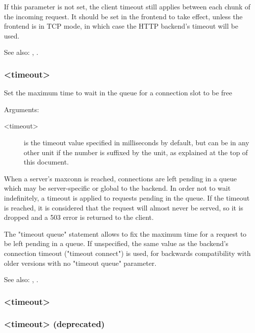 {  If this parameter is not set, the client timeout still applies between each
  chunk of the incoming request. It should be set in the frontend to take
  effect, unless the frontend is in TCP mode, in which case the HTTP backend's
  timeout will be used.

  See also: , .

\subsubsection[timeout queue]{ <timeout>}

  Set the maximum time to wait in the queue for a connection slot to be free


  Arguments:
  \begin{description}
  \item[<timeout>] is the timeout value specified in milliseconds by default, but
              can be in any other unit if the number is suffixed by the unit,
              as explained at the top of this document.
  \end{description}

  When a server's maxconn is reached, connections are left pending in a queue
  which may be server-specific or global to the backend. In order not to wait
  indefinitely, a timeout is applied to requests pending in the queue. If the
  timeout is reached, it is considered that the request will almost never be
  served, so it is dropped and a 503 error is returned to the client.

  The "timeout queue" statement allows to fix the maximum time for a request to
  be left pending in a queue. If unspecified, the same value as the backend's
  connection timeout ("timeout connect") is used, for backwards compatibility
  with older versions with no "timeout queue" parameter.

  See also: , .

\subsubsection[timeout server]{ <timeout>}
\subsubsection[timeout srvtimeout]{ <timeout> (deprecated)}

}
